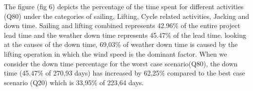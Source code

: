 The figure (fig 6) depicts the percentage of the time spent for different activities (Q80) under the categories of sailing, Lifting, Cycle related activities, Jacking and down time. Sailing and lifting combined represents 42.96\% of the entire project lead time and the weather down time represents 45.47\% of the lead time. looking at the causes of the down time, 69,03\% of weather down time is caused by the lifting operation in which the wind speed is the dominant factor. When we consider the down time percentage for the worst case scenario(Q80), the down time (45.47\% of 270,93 days) has increased by 62,25\% compared to the best case scenario (Q20) which is 33,95\% of 223,64 days.